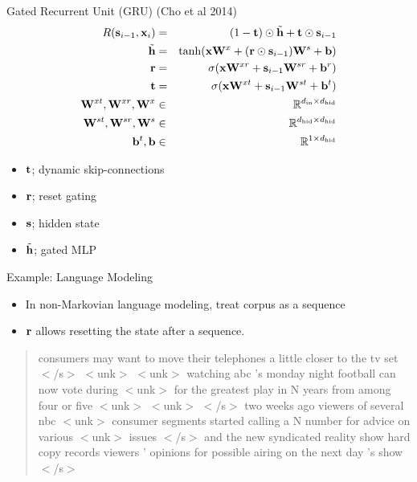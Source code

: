 \documentclass{beamer}
\begin{document}
\begin{frame}{Gated Recurrent Unit (GRU) (Cho et al 2014)}
    \begin{eqnarray*}
      R(\mathbf{s}_{i-1}, \mathbf{x}_i) &=& (1-\mathbf{t}) \odot \tilde{\mathbf{h}} + \mathbf{t} \odot \mathbf{s}_{i-1} \\
      \tilde{\mathbf{h}} &=& \tanh(\mathbf{x} \mathbf{W}^x + (\mathbf{r} \odot \mathbf{s}_{i-1})  \mathbf{W}^s + \mathbf{b})  \\
      \mathbf{r} &=& \sigma(\mathbf{x} \mathbf{W}^{xr} + \mathbf{s}_{i-1}\mathbf{W}^{sr} + \mathbf{b}^r) \\
      \mathbf{t} &=& \sigma(\mathbf{x} \mathbf{W}^{xt} + \mathbf{s}_{i-1}\mathbf{W}^{st} + \mathbf{b}^t) \\
      \mathbf{W}^{xt}, \mathbf{W}^{xr}, \mathbf{W}^{x} &\in& \mathbb{R}^{{d_{\mathrm{in}}} \times {d_{\mathrm{hid}}}} \\
      \mathbf{W}^{st}, \mathbf{W}^{sr}, \mathbf{W}^{s} &\in& \mathbb{R}^{{d_{\mathrm{hid}}} \times {d_{\mathrm{hid}}}} \\
      \mathbf{b}^t, \mathbf{b} &\in& \mathbb{R}^{1 \times {d_{\mathrm{hid}}}} \\
    \end{eqnarray*}

    \begin{itemize}
    \item $\mathbf{t}$; dynamic skip-connections
    \item $\mathbf{r}$; reset gating
    \item $\mathbf{s}$; hidden state
    \item $\tilde{\mathbf{h}}$; gated MLP
    \end{itemize}
\end{frame}

\begin{frame}{Example: Language Modeling}
  \begin{itemize}
  \item In non-Markovian language modeling, treat corpus as a sequence
    \air 
  \item $\mathbf{r}$ allows resetting the state after a sequence. 
  \end{itemize}
  \begin{quote}
    consumers may want to move their telephones a little closer to the
    tv set $<$/s$>$ $<$unk$>$ $<$unk$>$ watching abc 's monday night
    football can now vote during $<$unk$>$ for the greatest play in N
    years from among four or five $<$unk$>$ $<$unk$>$ $<$/s$>$ two
    weeks ago viewers of several nbc $<$unk$>$ consumer segments
    started calling a N number for advice on various $<$unk$>$ issues
    $<$/s$>$ and the new syndicated reality show hard copy records
    viewers ' opinions for possible airing on the next day 's show
    $<$/s$>$
  \end{quote}
\end{frame}
\end{document}
